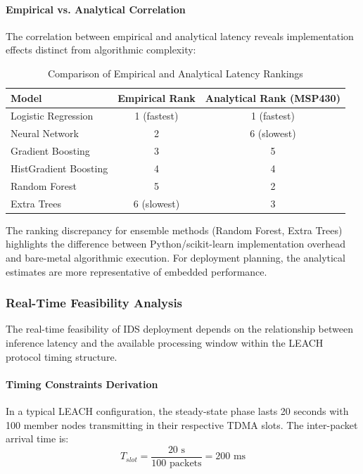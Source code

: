 \paragraph{Empirical vs. Analytical Correlation}
The correlation between empirical and analytical latency reveals implementation effects distinct from algorithmic complexity:

\begin{table}[htbp]
\centering
\caption{Comparison of Empirical and Analytical Latency Rankings}
\label{tab:latency_comparison}
\begin{tabular}{lcc}
\hline
\textbf{Model} & \textbf{Empirical Rank} & \textbf{Analytical Rank (MSP430)} \\
\hline
Logistic Regression & 1 (fastest) & 1 (fastest) \\
Neural Network & 2 & 6 (slowest) \\
Gradient Boosting & 3 & 5 \\
HistGradient Boosting & 4 & 4 \\
Random Forest & 5 & 2 \\
Extra Trees & 6 (slowest) & 3 \\
\hline
\end{tabular}
\end{table}

The ranking discrepancy for ensemble methods (Random Forest, Extra Trees) highlights the difference between Python/scikit-learn implementation overhead and bare-metal algorithmic execution. For deployment planning, the analytical estimates are more representative of embedded performance.

\subsubsection{Real-Time Feasibility Analysis}

The real-time feasibility of IDS deployment depends on the relationship between inference latency and the available processing window within the LEACH protocol timing structure.

\paragraph{Timing Constraints Derivation}
In a typical LEACH configuration, the steady-state phase lasts 20 seconds with 100 member nodes transmitting in their respective TDMA slots. The inter-packet arrival time is:
\begin{equation}
    T_{slot} = \frac{20 \text{ s}}{100 \text{ packets}} = 200 \text{ ms}
\end{equation}


